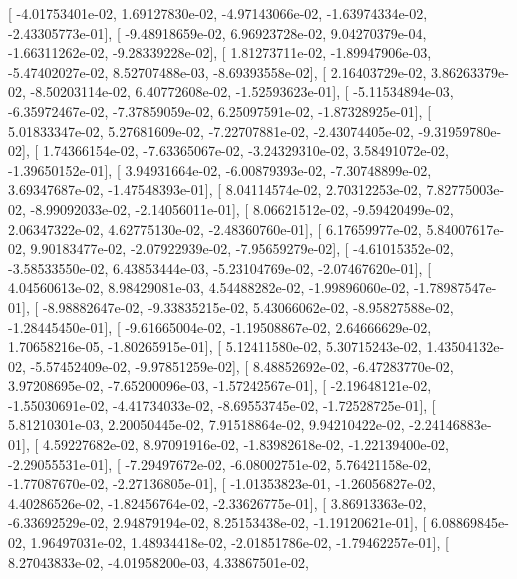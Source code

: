 \documentclass{article}
\begin{document}
       [ -4.01753401e-02,   1.69127830e-02,  -4.97143066e-02,
         -1.63974334e-02,  -2.43305773e-01],
       [ -9.48918659e-02,   6.96923728e-02,   9.04270379e-04,
         -1.66311262e-02,  -9.28339228e-02],
       [  1.81273711e-02,  -1.89947906e-03,  -5.47402027e-02,
          8.52707488e-03,  -8.69393558e-02],
       [  2.16403729e-02,   3.86263379e-02,  -8.50203114e-02,
          6.40772608e-02,  -1.52593623e-01],
       [ -5.11534894e-03,  -6.35972467e-02,  -7.37859059e-02,
          6.25097591e-02,  -1.87328925e-01],
       [  5.01833347e-02,   5.27681609e-02,  -7.22707881e-02,
         -2.43074405e-02,  -9.31959780e-02],
       [  1.74366154e-02,  -7.63365067e-02,  -3.24329310e-02,
          3.58491072e-02,  -1.39650152e-01],
       [  3.94931664e-02,  -6.00879393e-02,  -7.30748899e-02,
          3.69347687e-02,  -1.47548393e-01],
       [  8.04114574e-02,   2.70312253e-02,   7.82775003e-02,
         -8.99092033e-02,  -2.14056011e-01],
       [  8.06621512e-02,  -9.59420499e-02,   2.06347322e-02,
          4.62775130e-02,  -2.48360760e-01],
       [  6.17659977e-02,   5.84007617e-02,   9.90183477e-02,
         -2.07922939e-02,  -7.95659279e-02],
       [ -4.61015352e-02,  -3.58533550e-02,   6.43853444e-03,
         -5.23104769e-02,  -2.07467620e-01],
       [  4.04560613e-02,   8.98429081e-03,   4.54488282e-02,
         -1.99896060e-02,  -1.78987547e-01],
       [ -8.98882647e-02,  -9.33835215e-02,   5.43066062e-02,
         -8.95827588e-02,  -1.28445450e-01],
       [ -9.61665004e-02,  -1.19508867e-02,   2.64666629e-02,
          1.70658216e-05,  -1.80265915e-01],
       [  5.12411580e-02,   5.30715243e-02,   1.43504132e-02,
         -5.57452409e-02,  -9.97851259e-02],
       [  8.48852692e-02,  -6.47283770e-02,   3.97208695e-02,
         -7.65200096e-03,  -1.57242567e-01],
       [ -2.19648121e-02,  -1.55030691e-02,  -4.41734033e-02,
         -8.69553745e-02,  -1.72528725e-01],
       [  5.81210301e-03,   2.20050445e-02,   7.91518864e-02,
          9.94210422e-02,  -2.24146883e-01],
       [  4.59227682e-02,   8.97091916e-02,  -1.83982618e-02,
         -1.22139400e-02,  -2.29055531e-01],
       [ -7.29497672e-02,  -6.08002751e-02,   5.76421158e-02,
         -1.77087670e-02,  -2.27136805e-01],
       [ -1.01353823e-01,  -1.26056827e-02,   4.40286526e-02,
         -1.82456764e-02,  -2.33626775e-01],
       [  3.86913363e-02,  -6.33692529e-02,   2.94879194e-02,
          8.25153438e-02,  -1.19120621e-01],
       [  6.08869845e-02,   1.96497031e-02,   1.48934418e-02,
         -2.01851786e-02,  -1.79462257e-01],
       [  8.27043833e-02,  -4.01958200e-03,   4.33867501e-02,
\end{document}
